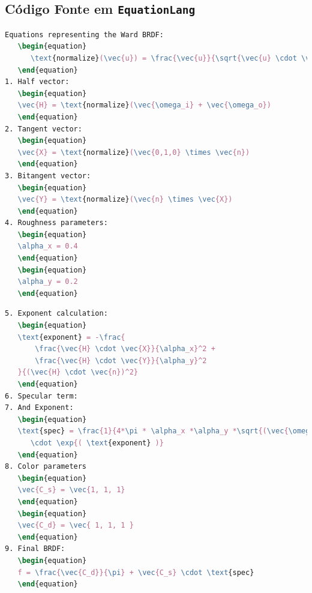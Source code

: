 \subsection{Código Fonte em \texttt{EquationLang}}
\begin{codigo}[H]
    \caption{\small Código fonte da BRDF deste experimento (parte 1).}
    \label{cod-ward-eqlang-pt-1}
\begin{lstlisting}[language=tex, frame=none, inputencoding=utf8]
Equations representing the Ward BRDF:
   \begin{equation}
      \text{normalize}(\vec{u}) = \frac{\vec{u}}{\sqrt{\vec{u} \cdot \vec{u}}}
   \end{equation}
1. Half vector:
   \begin{equation}
   \vec{H} = \text{normalize}(\vec{\omega_i} + \vec{\omega_o})
   \end{equation}
2. Tangent vector:
   \begin{equation}
   \vec{X} = \text{normalize}(\vec{0,1,0} \times \vec{n})
   \end{equation}
3. Bitangent vector:
   \begin{equation}
   \vec{Y} = \text{normalize}(\vec{n} \times \vec{X})
   \end{equation}
4. Roughness parameters:
   \begin{equation}
   \alpha_x = 0.4
   \end{equation}
   \begin{equation}
   \alpha_y = 0.2
   \end{equation}
\end{lstlisting}
\end{codigo}

\begin{codigo}[H]
    \caption{\small Código fonte da BRDF deste experimento (parte 2).}
    \label{cod-ward-eqlang-pt-2}
\begin{lstlisting}[language=tex, frame=none, inputencoding=utf8]
5. Exponent calculation:
   \begin{equation}
   \text{exponent} = -\frac{
       \frac{\vec{H} \cdot \vec{X}}{\alpha_x}^2 +
       \frac{\vec{H} \cdot \vec{Y}}{\alpha_y}^2
   }{(\vec{H} \cdot \vec{n})^2}
   \end{equation}
6. Specular term:
7. And Exponent:
   \begin{equation}
   \text{spec} = \frac{1}{4*\pi * \alpha_x *\alpha_y *\sqrt{(\vec{\omega_i} \cdot \vec{n}) * (\vec{\omega_o} \cdot \vec{n})}}
      \cdot \exp{( \text{exponent} )}
   \end{equation}
8. Color parameters
   \begin{equation}
   \vec{C_s} = \vec{1, 1, 1}
   \end{equation}
   \begin{equation}
   \vec{C_d} = \vec{ 1, 1, 1 }
   \end{equation}
9. Final BRDF:
   \begin{equation}
   f = \frac{\vec{C_d}}{\pi} + \vec{C_s} \cdot \text{spec}
   \end{equation}
\end{lstlisting}
\end{codigo}
